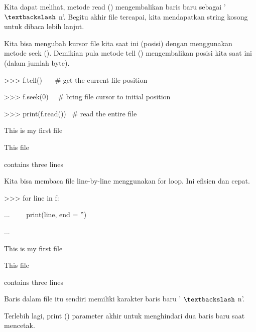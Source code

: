 \vspace{12pt}
\noindent 
Kita dapat melihat, metode read () mengembalikan baris baru sebagai ' $  \textbackslash  $ n'. Begitu akhir file tercapai, kita mendapatkan string kosong untuk dibaca lebih lanjut. \par
\vspace{12pt}
\noindent 
Kita bisa mengubah kursor file kita saat ini (posisi) dengan menggunakan metode seek (). Demikian pula metode tell () mengembalikan posisi kita saat ini (dalam jumlah byte). \par
\vspace{12pt}
\noindent 
>>> f.tell()~~~  $  \#  $ get the current file position \par
{} \par
\vspace{12pt}
\noindent 
>>> f.seek(0)~~  $  \#  $ bring file cursor to initial position \par
{} \par
\vspace{12pt}
\noindent 
>>> print(f.read())~  $  \#  $ read the entire file \par
\noindent 
This is my first file \par
\noindent 
This file \par
\noindent 
contains three lines \par
\vspace{12pt}
\vspace{16pt}
\noindent 
Kita bisa membaca file line-by-line menggunakan for loop. Ini efisien dan cepat. \par
\vspace{12pt}
\noindent 
>>> for line in f: \par
\noindent 
...~~~~ print(line, end = '') \par
\noindent 
... \par
\noindent 
This is my first file \par
\noindent 
This file \par
\noindent 
contains three lines \par
\vspace{12pt}
\vspace{12pt}
\noindent 
Baris dalam file itu sendiri memiliki karakter baris baru ' $  \textbackslash  $ n'. \par
\vspace{12pt}
\noindent 
Terlebih lagi, print () parameter akhir untuk menghindari dua baris baru saat mencetak. \par
